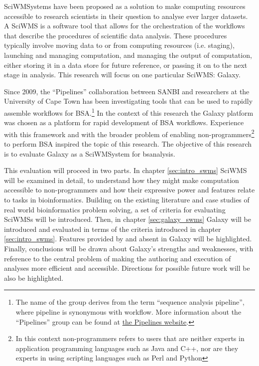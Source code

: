 \documentclass[a4paper,10pt]{scrreprt}
\begin{document}
\Glspl{SciWMSystem} have been proposed as a solution to make computing resources accessible to research scientists in their question to analyse ever larger datasets. \cite{deelman_workflows_2009} A \gls{SciWMS} is a software tool that allows for the orchestration of the \glspl{workflow} that describe the procedures of scientific data analysis. These procedures typically involve moving data to or from computing resources (i.e. staging), launching and managing computation, and managing the output of computation, either storing it in a data store for future reference, or passing it on to the next stage in analysis. This research will focus on one particular \gls{SciWMS}: Galaxy.


Since 2009, the ``Pipelines'' collaboration between SANBI \cite{pipelines_working_group_bio-analysis_2011} and researchers at the University of Cape Town has been investigating tools that can be used to rapidly assemble \glspl{workflow} for \gls{BSA}.\footnote{The name of the group derives from the term ``sequence analysis pipeline'', where pipeline is synonymous with workflow. More information about the ``Pipelines'' group can be found at \href{https://pipelines.sanbi.ac.za}{the Pipelines website}.} In the context of this research the Galaxy platform \cite{giardine_galaxy:_2005} was chosen as a platform for rapid development of \gls{BSA} \glspl{workflow}. Experience with this framework and with the broader problem of enabling non-programmers\footnote{In this context non-programmers refers to users that are neither experts in application programming languages such as Java and C++, nor are they experts in using scripting languages such as Perl and Python} to perform \gls{BSA} inspired the topic of this 
research. The objective of this research is to evaluate Galaxy as a \gls{SciWMSystem} for \gls{bsanalysis}.

This evaluation will proceed in two parts. In chapter \ref{sec:intro_swms} \gls{SciWMS} will be examined in detail, to understand how they might make computation accessible to non-programmers and how their expressive power and features relate to tasks in bioinformatics. Building on the existing literature and case studies of real world bioinformatics problem solving, a set of criteria for evaluating \glspl{SciWMS} will be introduced. Then, in chapter \ref{sec:galaxy_swms} Galaxy will be introduced and evaluated in terms of the criteria introduced in chapter \ref{sec:intro_swms}. Features provided by and absent in Galaxy will be highlighted. Finally, conclusions will be drawn about Galaxy's strengths and weaknesses, with reference to the central problem of making the authoring and execution of analyses more efficient and accessible. Directions for possible future work will be also be highlighted.
\end{document}
